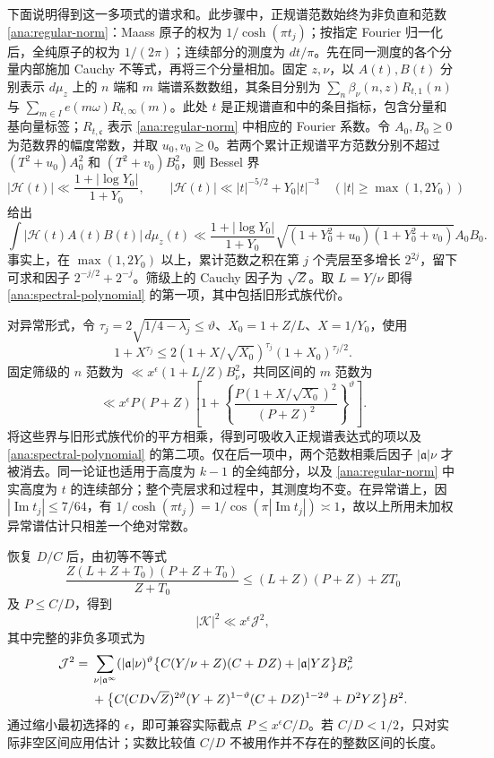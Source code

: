 下面说明得到这一多项式的谱求和。此步骤中，正规谱范数始终为非负直和范数 \eqref{ana:regular-norm}：Maass 原子的权为 $1/\cosh(\pi t_j)$；按指定 Fourier 归一化后，全纯原子的权为 $1/(2\pi)$；连续部分的测度为 $dt/\pi$。先在同一测度的各个分量内部施加 Cauchy 不等式，再将三个分量相加。固定 $z,\nu$，以 $A(t),B(t)$ 分别表示 $d\mu_z$ 上的 $n$ 端和 $m$ 端谱系数数组，其条目分别为 $\sum_n\beta_\nu(n,z)R_{t,1}(n)$ 与 $\sum_{m\in I}e(m\omega)R_{t,\infty}(m)$。此处 $t$ 是正规谱直和中的条目指标，包含分量和基向量标签；$R_{t,\mathfrak c}$ 表示 \eqref{ana:regular-norm} 中相应的 Fourier 系数。令 $A_0,B_0\ge0$ 为范数界的幅度常数，并取 $u_0,v_0\ge0$。若两个累计正规谱平方范数分别不超过 $(T^2+u_0)A_0^2$ 和 $(T^2+v_0)B_0^2$，则 Bessel 界
\[
 |\mathcal H(t)|\ll\frac{1+|\log Y_0|}{1+Y_0},\qquad
 |\mathcal H(t)|\ll |t|^{-5/2}+Y_0|t|^{-3}
 \quad(|t|\ge\max(1,2Y_0))
\]
给出
\[
 \int|\mathcal H(t)A(t)B(t)|\,d\mu_z(t)
 \ll \frac{1+|\log Y_0|}{1+Y_0}
 \sqrt{(1+Y_0^2+u_0)(1+Y_0^2+v_0)}A_0B_0.
\]
事实上，在 $\max(1,2Y_0)$ 以上，累计范数之积在第 $j$ 个壳层至多增长 $2^{2j}$，留下可求和因子 $2^{-j/2}+2^{-j}$。筛级上的 Cauchy 因子为 $\sqrt Z$。取 $L=Y/\nu$ 即得 \eqref{ana:spectral-polynomial} 的第一项，其中包括旧形式族代价。

对异常形式，令 $\tau_j=2\sqrt{1/4-\lambda_j}\le\vartheta$、$X_0=1+Z/L$、$X=1/Y_0$，使用
\[
 1+X^{\tau_j}\le
 2(1+X/\sqrt{X_0})^{\tau_j}(1+X_0)^{\tau_j/2}.
\]
固定筛级的 $n$ 范数为 $\ll x^\epsilon(1+L/Z)B_\nu^2$，共同区间的 $m$ 范数为
\[
 \ll x^\epsilon P(P+Z)
 \left[1+\left\{
  \frac{P(1+X/\sqrt{X_0})^2}{(P+Z)^2}\right\}^{\vartheta}\right].
\]
将这些界与旧形式族代价的平方相乘，得到可吸收入正规谱表达式的项以及 \eqref{ana:spectral-polynomial} 的第二项。仅在后一项中，两个范数相乘后因子 $|\mathfrak{a}|\nu$ 才被消去。同一论证也适用于高度为 $k-1$ 的全纯部分，以及 \eqref{ana:regular-norm} 中实高度为 $t$ 的连续部分；整个壳层求和过程中，其测度均不变。在异常谱上，因 $|\operatorname{Im}t_j|\le7/64$，有 $1/\cosh(\pi t_j)=1/\cos(\pi|\operatorname{Im}t_j|)\asymp1$，故以上所用未加权异常谱估计只相差一个绝对常数。

恢复 $D/C$ 后，由初等不等式
\[
 \frac{Z(L+Z+T_0)(P+Z+T_0)}{Z+T_0}
       \le(L+Z)(P+Z)+ZT_0
\]
及 $P\le C/D$，得到
\[
 |\mathcal K|^2\ll x^\epsilon\mathcal J^2,
\]
其中完整的非负多项式为
\begin{align}
 \mathcal J^2={}&\sum_{\nu\mid \mathfrak{a}^\infty}(|\mathfrak{a}|\nu)^\vartheta
 \bigl\{C(Y/\nu+Z)(C+DZ)+|\mathfrak{a}|YZ\bigr\}B_\nu^2
 \notag\\
 &+\bigl\{
 C(CD\sqrt Z)^{2\vartheta}(Y+Z)^{1-\vartheta}
                         (C+DZ)^{1-2\vartheta}+D^2YZ\bigr\}B^2.
 \label{ana:returned-polynomial}
\end{align}
通过缩小最初选择的 $\epsilon$，即可兼容实际截点 $P\le x^\epsilon C/D$。若 $C/D<1/2$，只对实际非空区间应用估计；实数比较值 $C/D$ 不被用作并不存在的整数区间的长度。

